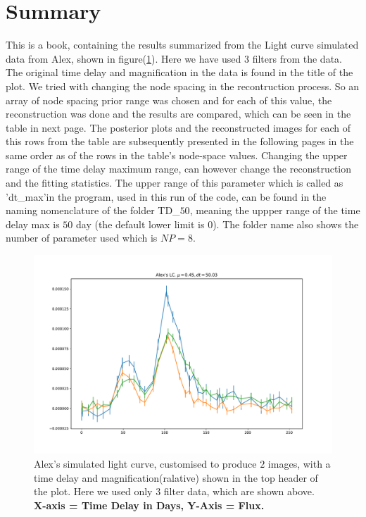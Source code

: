 \documentclass{article}
\begin{document}
\section*{Summary}
This is a book, containing the results summarized from the Light curve simulated data from Alex, shown in figure(\ref{A}). Here we have used $3$ filters from the data. The original time delay and magnification in the data is found in the title of the plot. We tried with changing the node spacing in the recontruction process. So an array of node spacing prior range was chosen and for each of this value, the reconstruction was done and the results are compared, which can be seen in the table in next page. The posterior plots and the reconstructed images for each of this rows from the table are subsequently presented in the following pages in the same order as of the rows in the table's node-space values.
Changing the upper range of the time delay maximum range, can however change the reconstruction and the fitting statistics. The upper range of this parameter which is called as 'dt\_max'in the program, used in this run of the code, can be found in the naming nomenclature of the folder TD\_$50$, meaning the uppper range of the time delay max is $50$ day (the default lower limit is $0$). The folder name also shows the number of parameter used which is $NP=8$. 
  

\begin{figure}[h!]
  \centering
    \includegraphics[width=\textwidth]{Alex_LC.pdf}
  \caption{Alex's simulated light curve, customised to produce $2$ images, with a time delay and magnification(ralative) shown in the top header of the plot. Here we used only $3$ filter data, which are shown above.\\\hspace{\textwidth}\textbf{X-axis = Time Delay in Days, Y-Axis = Flux.}}
  \label{A}
\end{figure}
\end{document}
